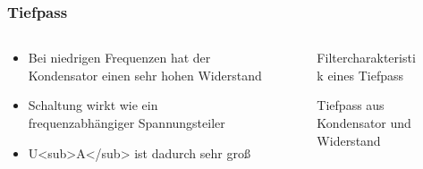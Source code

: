 \begin{frame}

\end{frame}

\begin{frame}
\frametitle{Tiefpass}
\begin{columns}
    \begin{column}{0.48\textwidth}
    \begin{itemize}
  \item Bei niedrigen Frequenzen hat der Kondensator einen sehr hohen Widerstand
  \item Schaltung wirkt wie ein frequenzabhängiger Spannungsteiler
  \item U<sub>A</sub> ist dadurch sehr groß
  \end{itemize}

    \end{column}
   \begin{column}{0.48\textwidth}
       
\begin{figure}
    \caption{\scriptsize Filtercharakteristik eines Tiefpass}
    \label{e_hochpass}
\end{figure}


\begin{figure}
    \caption{\scriptsize Tiefpass aus Kondensator und Widerstand}
    \label{e_tiefpass_rc}
\end{figure}


   \end{column}
\end{columns}

\end{frame}

